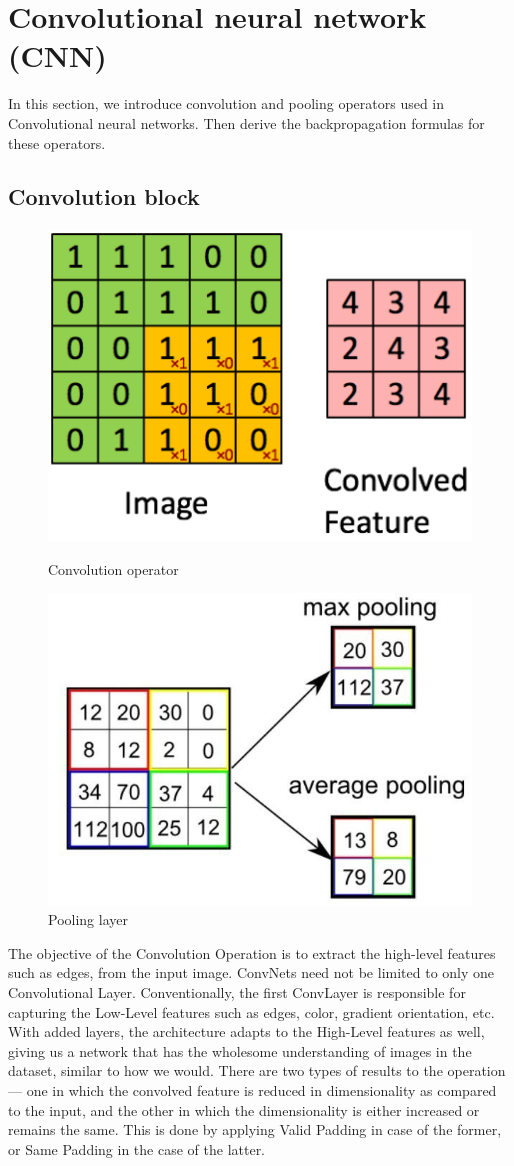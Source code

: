 \documentclass[10pt]{SelfArx} %
\begin{document}
	\section{Convolutional neural network (CNN)}
	In this section, we introduce convolution and pooling operators used in Convolutional neural networks. Then derive the backpropagation formulas for these operators. 
	\subsection{Convolution block}
	\begin{figure}\centering 
		\includegraphics[width=.6\linewidth]{img/conv}
		\caption{Convolution operator}		
		\includegraphics[width=.6\linewidth]{img/pooling}
		\caption{Pooling layer}	
	\end{figure}
	The objective of the Convolution Operation is to extract the high-level features such as edges, from the input image. ConvNets need not be limited to only one Convolutional Layer. Conventionally, the first ConvLayer is responsible for capturing the Low-Level features such as edges, color, gradient orientation, etc. With added layers, the architecture adapts to the High-Level features as well, giving us a network that has the wholesome understanding of images in the dataset, similar to how we would.
	There are two types of results to the operation — one in which the convolved feature is reduced in dimensionality as compared to the input, and the other in which the dimensionality is either increased or remains the same. This is done by applying Valid Padding in case of the former, or Same Padding in the case of the latter.
\end{document}
